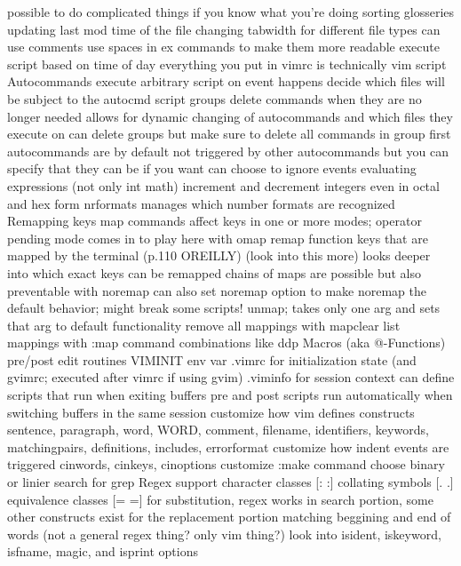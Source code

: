 \documentclass[12pt]{book}
\begin{document}
{{      possible to do complicated things if you know what you're doing
        sorting glosseries
        updating last mod time of the file
        changing tabwidth for different file types
      can use comments
      use spaces in ex commands to make them more readable
    execute script based on time of day
    everything you put in vimrc is technically vim script
    Autocommands
      execute arbitrary script on event happens
      decide which files will be subject to the autocmd script
      groups
      delete commands when they are no longer needed
        allows for dynamic changing of autocommands and which files they execute on
      can delete groups but make sure to delete all commands in group first
      autocommands are by default not triggered by other autocommands but you can specify that they can be if you want
      can choose to ignore events
    evaluating expressions (not only int math)
    increment and decrement integers even in octal and hex form
      nrformats manages which number formats are recognized
  Remapping keys
    map commands affect keys in one or more modes; operator pending mode comes in to play here with omap
    remap function keys that are mapped by the terminal (p.110 OREILLY) (look into this more)
      looks deeper into which exact keys can be remapped
    chains of maps are possible but also preventable with noremap
      can also set noremap option to make noremap the default behavior; might break some scripts!
    unmap; takes only one arg and sets that arg to default functionality
    remove all mappings with mapclear
    list mappings with :map
  command combinations like ddp
  Macros (aka @-Functions)
  pre/post edit routines
    VIMINIT env var
    .vimrc for initialization state (and gvimrc; executed after vimrc if using gvim)
    .viminfo for session context
    can define scripts that run when exiting buffers
    pre and post scripts run automatically when switching buffers in the same session
  customize how vim defines constructs
    sentence, paragraph, word, WORD, comment, filename, identifiers, keywords, matchingpairs, definitions, includes, errorformat
  customize how indent events are triggered
    cinwords, cinkeys, cinoptions
  customize :make command
  choose binary or linier search for grep
Regex support
  character classes [: :]
  collating symbols [. .]
  equivalence classes [= =]
  for substitution, regex works in search portion, some other constructs exist for the replacement portion
  matching beggining and end of words (not a general regex thing? only vim thing?)
  look into isident, iskeyword, isfname, magic, and isprint options
}}
\end{document}
